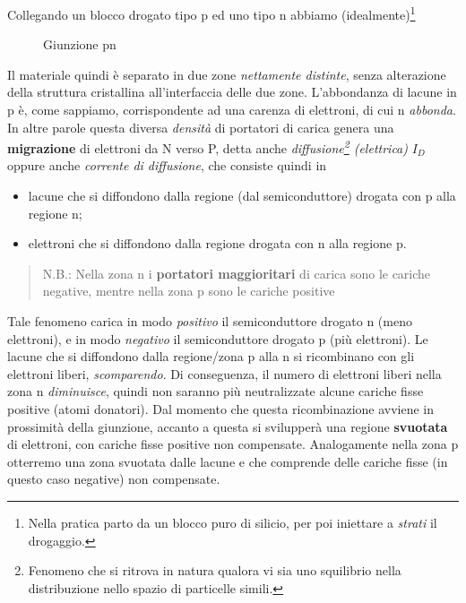\documentclass[
]{book}
\providecommand{\tightlist}{%
  \setlength{\itemsep}{0pt}\setlength{\parskip}{0pt}}
\begin{document}
Collegando un blocco drogato tipo p ed uno tipo n abbiamo
(idealmente)\footnote{Nella pratica parto da un blocco puro di silicio,
  per poi iniettare a \emph{strati} il drogaggio.}

\begin{figure}[H]
\centering
{}
\caption{Giunzione pn}
\end{figure}

Il materiale quindi è separato in due zone \emph{nettamente distinte},
senza alterazione della struttura cristallina all'interfaccia delle due
zone. \newline L'abbondanza di lacune in p è, come sappiamo,
corrispondente ad una carenza di elettroni, di cui n \emph{abbonda}. In
altre parole questa diversa \emph{densità} di portatori di carica genera
una \textbf{migrazione} di elettroni da N verso P, detta anche
\emph{diffusione\footnote{Fenomeno che si ritrova in natura qualora vi
  sia uno squilibrio nella distribuzione nello spazio di particelle
  simili.} (elettrica)} \(I_D\) oppure anche \emph{corrente di
diffusione}, che consiste quindi in

\begin{itemize}
\tightlist
\item
  lacune che si diffondono dalla regione (dal semiconduttore) drogata
  con p alla regione n;
\item
  elettroni che si diffondono dalla regione drogata con n alla regione
  p.
\end{itemize}

\begin{quote}
N.B.: Nella zona n i \textbf{portatori maggioritari} di carica sono le
cariche negative, mentre nella zona p sono le cariche positive
\end{quote}

Tale fenomeno carica in modo \emph{positivo} il semiconduttore drogato n
(meno elettroni), e in modo \emph{negativo} il semiconduttore drogato p
(più elettroni). \newline Le lacune che si diffondono dalla regione/zona
p alla n si ricombinano con gli elettroni liberi, \emph{scomparendo}. Di
conseguenza, il numero di elettroni liberi nella zona n
\emph{diminuisce}, quindi non saranno più neutralizzate alcune cariche
fisse positive (atomi donatori). Dal momento che questa ricombinazione
avviene in prossimità della giunzione, accanto a questa si svilupperà
una regione \textbf{svuotata} di elettroni, con cariche fisse positive
non compensate. \newline Analogamente nella zona p otterremo una zona
svuotata dalle lacune e che comprende delle cariche fisse (in questo
caso negative) non compensate.
\end{document}
